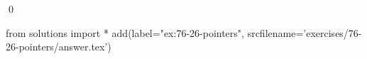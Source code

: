 
\begin{ex}
  \label{ex:76-26-pointers}
  
  \qed
\end{ex}
\begin{python0}
from solutions import *
add(label="ex:76-26-pointers",
    srcfilename='exercises/76-26-pointers/answer.tex')
\end{python0}
